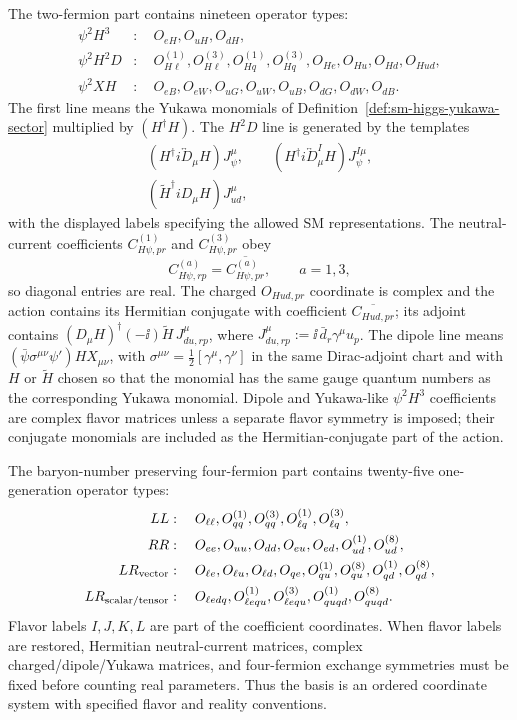 \begin{definition}
The two-fermion part contains nineteen operator types:
\[
\begin{aligned}
\psi^2H^3&:\quad
  O_{eH},O_{uH},O_{dH},\\
\psi^2H^2D&:\quad
  O_{H\ell}^{(1)},O_{H\ell}^{(3)},
  O_{Hq}^{(1)},O_{Hq}^{(3)},
  O_{He},O_{Hu},O_{Hd},O_{Hud},\\
\psi^2XH&:\quad
  O_{eB},O_{eW},
  O_{uG},O_{uW},O_{uB},
  O_{dG},O_{dW},O_{dB}.
\end{aligned}
\]
The first line means the Yukawa monomials of
Definition~\ref{def:sm-higgs-yukawa-sector} multiplied by
\((H^\dagger H)\).  The \(H^2D\) line is generated by the templates
\[
  \begin{gathered}
  (H^\dagger i\overleftrightarrow D_\mu H)
  J_\psi^\mu,
  \qquad
  (H^\dagger i\overleftrightarrow D_\mu^I H)
  J_\psi^{I\mu},\\
  (\widetilde H^\dagger iD_\mu H)J_{ud}^\mu,
  \end{gathered}
\]
with the displayed labels specifying the allowed SM representations.  The
neutral-current coefficients \(C_{H\psi,pr}^{(1)}\) and
\(C_{H\psi,pr}^{(3)}\) obey
\[
  C_{H\psi,rp}^{(a)}=\overline{C_{H\psi,pr}^{(a)}},
  \qquad a=1,3,
\]
so diagonal entries are real.  The charged \(O_{Hud,pr}\) coordinate is
complex and the action contains its Hermitian conjugate with coefficient
\(\overline{C_{Hud,pr}}\); its adjoint contains
\((D_\mu H)^\dagger(-\ii)\widetilde H\,J_{du,rp}^{\mu}\), where
\(J_{du,rp}^{\mu}:=\ii\,\bar d_r\gamma^\mu u_p\).
The dipole line means \((\bar\psi\sigma^{\mu\nu}\psi')HX_{\mu\nu}\), with
\(\sigma^{\mu\nu}=\frac12[\gamma^\mu,\gamma^\nu]\) in the same Dirac-adjoint
chart and with \(H\) or \(\widetilde H\) chosen so that the monomial has the
same gauge quantum numbers as the corresponding Yukawa monomial.  Dipole and
Yukawa-like \(\psi^2H^3\) coefficients are complex flavor matrices unless a
separate flavor symmetry is imposed; their conjugate monomials are included as
the Hermitian-conjugate part of the action.

The baryon-number preserving four-fermion part contains twenty-five
one-generation operator types:
\[
\begin{aligned}
LL&:\quad
  O_{\ell\ell},O_{qq}^{(1)},O_{qq}^{(3)},
  O_{\ell q}^{(1)},O_{\ell q}^{(3)},\\
RR&:\quad
  O_{ee},O_{uu},O_{dd},O_{eu},O_{ed},
  O_{ud}^{(1)},O_{ud}^{(8)},\\
LR_{\rm vector}&:\quad
  O_{\ell e},O_{\ell u},O_{\ell d},O_{qe},
  O_{qu}^{(1)},O_{qu}^{(8)},O_{qd}^{(1)},O_{qd}^{(8)},\\
LR_{\rm scalar/tensor}&:\quad
  O_{\ell edq},O_{\ell equ}^{(1)},O_{\ell equ}^{(3)},
  O_{quqd}^{(1)},O_{quqd}^{(8)}.
\end{aligned}
\]
Flavor labels \(I,J,K,L\) are part of the coefficient coordinates.  When
flavor labels are restored, Hermitian neutral-current matrices, complex
charged/dipole/Yukawa matrices, and four-fermion exchange symmetries must be
fixed before counting real parameters.  Thus the basis is an ordered
coordinate system with specified flavor and reality conventions.
\end{definition}

